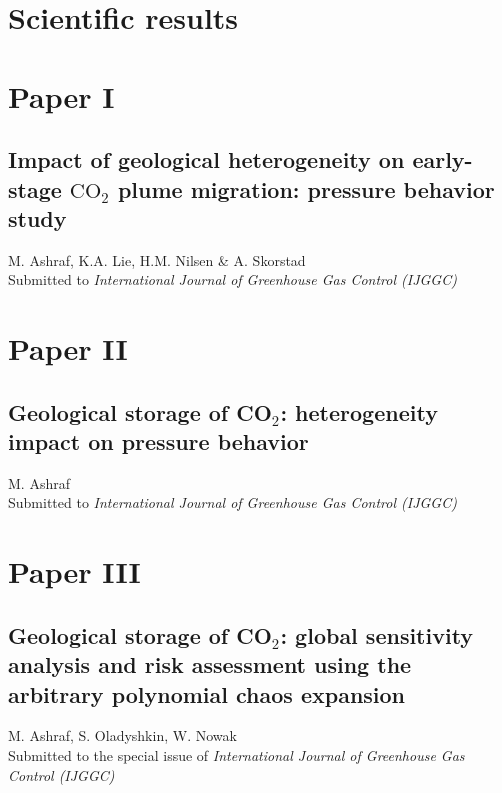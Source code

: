 \chapter{Scientific results}

\pagebreak

\chapter*{Paper I}
\section{Impact of geological heterogeneity on early-stage $\mbox{CO}_2$ plume
migration: pressure behavior study}

\noindent M. Ashraf, K.A. Lie, H.M. Nilsen \& A.
Skorstad\\

\noindent Submitted to \textit{International Journal of Greenhouse Gas Control
(IJGGC)}
\cleardoublepage




\chapter*{Paper II}
\section{Geological storage of CO$_2$: heterogeneity impact on pressure
behavior}

\noindent M. Ashraf\\

\noindent Submitted to \textit{International Journal of Greenhouse Gas Control
(IJGGC)}
\cleardoublepage



\chapter*{Paper III}
\section{Geological storage of CO$_2$: global sensitivity analysis
and risk assessment using the arbitrary polynomial
chaos expansion
}

\noindent M. Ashraf, S. Oladyshkin, W. Nowak\\

\noindent Submitted to the special issue of \textit{International Journal of
Greenhouse Gas Control (IJGGC)}
\cleardoublepage

